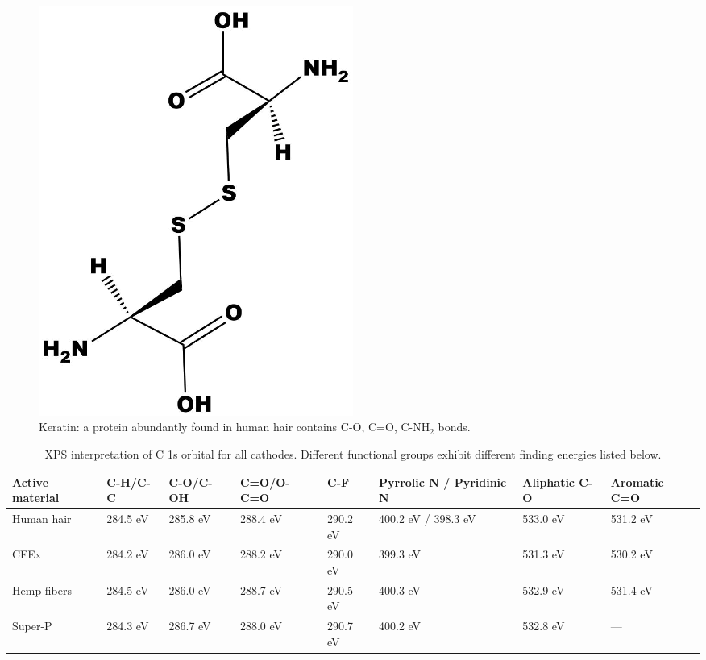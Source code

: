 \begin{figure}[h!]
\centering
\includegraphics[width=0.5\textwidth]{Figures/chap5fig/keratin}
\caption{Keratin: a protein abundantly found in human hair contains C-O, C=O, C-NH$_2$ bonds.}
\label{Figures/chap5fig:keratin}
\end{figure}

\begin{table}
\centering
\caption{XPS interpretation of C 1s orbital for all cathodes. Different functional groups exhibit different finding energies listed below.} \label{table2xps}
\begin{tabular}{ |p{2.5cm}|p{2cm}|p{2cm}|p{2cm}|p{1.5cm}|p{2.5cm}|p{2.5cm}|p{2.5cm}|}
\hline
\textbf{Active material} & \textbf{C-H/C-C} & \textbf{C-O/C-OH} & \textbf{C=O/O-C=O} & \textbf{C-F} & \textbf{Pyrrolic N / Pyridinic N} & \textbf{Aliphatic C-O} & \textbf{Aromatic C=O}\\
\hline
Human hair & 284.5 eV & 285.8 eV & 288.4 eV & 290.2 eV & 400.2 eV / 398.3 eV & 533.0 eV & 531.2 eV\\
CFEx & 284.2 eV & 286.0 eV & 288.2 eV & 290.0 eV & 399.3 eV & 531.3 eV & 530.2 eV\\
Hemp fibers & 284.5 eV & 286.0 eV & 288.7 eV & 290.5 eV & 400.3 eV & 532.9 eV & 531.4 eV\\
Super-P & 284.3 eV & 286.7 eV & 288.0 eV & 290.7 eV & 400.2 eV & 532.8 eV & ---\\
\hline
\end{tabular}
\end{table}

